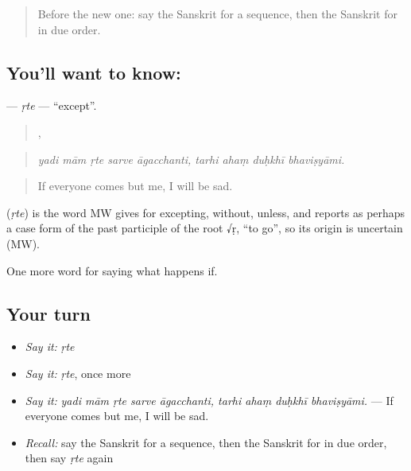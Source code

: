 \label{lesson:SA-C545-rte}



\begin{quote}
Before the new one: say the Sanskrit for a sequence, then the Sanskrit for in due order.
\end{quote}

\subsection*{You'll want to know: }
\textbf{} — \emph{ṛte} — \textquotedblleft{}except\textquotedblright{}.

\begin{quote}
    ,    
\end{quote}

\begin{quote}
\emph{yadi mām ṛte sarve āgacchanti, tarhi ahaṃ duḥkhī bhaviṣyāmi.}
\end{quote}

\begin{quote}
If everyone comes but me, I will be sad.
\end{quote}

\begin{cousinweb}
\textbf{} (\emph{ṛte}) is the word MW gives for excepting, without, unless, and reports as perhaps a case form of the past participle of the root √ṛ, \textquotedblleft{}to go\textquotedblright{}, so its origin is uncertain (MW).
\end{cousinweb}

\begin{grammarlens}[title={What you've built}]
One more word for saying what happens if.
\end{grammarlens}

\subsection*{Your turn}
\begin{itemize}
\raggedright
  \item \emph{Say it:} \emph{ṛte}
  \item \emph{Say it:} \emph{ṛte}, once more
  \item \emph{Say it:} \emph{yadi mām ṛte sarve āgacchanti, tarhi ahaṃ duḥkhī bhaviṣyāmi.} — If everyone comes but me, I will be sad.
  \item \emph{Recall:} say the Sanskrit for a sequence, then the Sanskrit for in due order, then say \emph{ṛte} again
\end{itemize}

